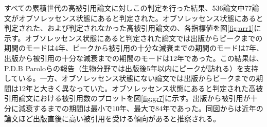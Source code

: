 すべての累積世代の高被引用論文に対しこの判定を行った結果、536論文中77論文がオブソレッセンス状態にあると判定された。オブソレッセンス状態にあると判定された、および判定されなかった高被引用論文の、各指標値を図\ref{fig:arr1}に示す。オブソレッセンス状態にあると判定された論文では出版からピークまでの期間のモードは4年、ピークから被引用の十分な減衰までの期間のモードは7年、出版から被引用の十分な減衰までの期間のモードは12年であった。この結果は、P.D.B Paroloらの報告（生物分野では出版後5年以内にピークが訪れる）を支持している。一方、オブソレッセンス状態にない論文では出版からピークまでの期間は12年と大きく異なっていた。オブソレッセンス状態にあると判定された高被引用論文における被引用数のプロットを図\ref{fig:gr7}に示す。出版から被引用が十分に減衰するまでの期間は最小で10年、最大で84年であった。同図からは近年の論文ほど出版直後に高い被引用を受ける傾向があると推察される。
